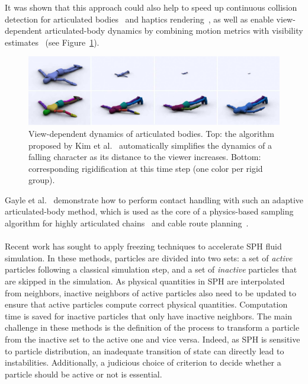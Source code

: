 It was shown that this approach could also help to speed up continuous collision detection for articulated bodies~\cite{Kim2008Collision} and haptics rendering~\cite{Morin2007}, as well as enable view-dependent articulated-body dynamics by combining motion metrics with visibility estimates~\cite{Kim2008View} (see Figure~\ref{fig:ViewDependentArticulatedBodies}).
\begin{figure}[!t]
	\includegraphics[width=\linewidth]{./images/starAdaptivity-cgf2016/WMComparisonNoLabels.png}
	\caption[STAR adaptivity: Articulated rigid body freezing]{\label{fig:ViewDependentArticulatedBodies}View-dependent dynamics of articulated bodies. Top: the algorithm proposed by Kim et al.~\cite{Kim2008Collision} automatically simplifies the dynamics of a falling character as its distance to the viewer increases. Bottom: corresponding rigidification at this time step (one color per rigid group).}
\end{figure}
Gayle et al.~\cite{Gayle2006} demonstrate how to perform contact handling with such an adaptive articulated-body method, which is used as the core of a physics-based sampling algorithm for highly articulated chains~\cite{Gayle2007} and cable route planning~\cite{Kabul2007}.
\paragraph*{}
Recent work has sought to apply freezing techniques to accelerate SPH fluid simulation.
In these methods, particles are divided into two sets: a set of \emph{active} particles following a classical simulation step, and a set of \emph{inactive} particles that are skipped in the simulation.
As physical quantities in SPH are interpolated from neighbors, inactive neighbors of active particles also need to be updated to ensure that active particles compute correct physical quantities.
Computation time is saved for inactive particles that only have inactive neighbors.
The main challenge in these methods is the definition of the process to transform a particle from the inactive set to the active one and vice versa.
Indeed, as SPH is sensitive to particle distribution, an inadequate transition of state can directly lead to instabilities.
Additionally, a judicious choice of criterion to decide whether a particle should be active or not is essential.

